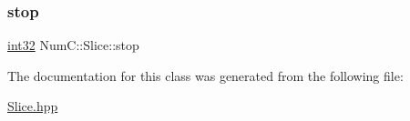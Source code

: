 \mbox{\label{class_num_c_1_1_slice_ab71a753be2f3a9fff01c71734e4368bb}} 
\subsubsection{\texorpdfstring{stop}{stop}}
{\footnotesize\ttfamily \mbox{\hyperlink{namespace_num_c_aa5a7e69266097d55816d4cdb19542b53}{int32}} Num\+C\+::\+Slice\+::stop}



The documentation for this class was generated from the following file\+:\begin{DoxyCompactItemize}
\item 
\mbox{\hyperlink{_slice_8hpp}{Slice.\+hpp}}\end{DoxyCompactItemize}
